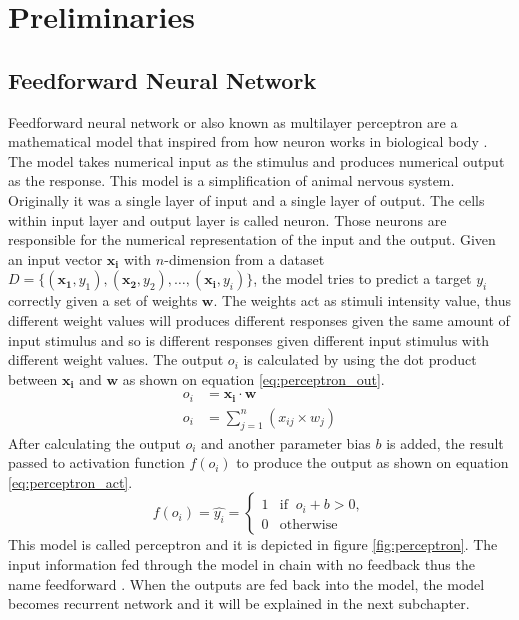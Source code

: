 \chapter{Preliminaries}
\label{chap:preliminaries}

\section{Feedforward Neural Network}
    Feedforward neural network or also known as multilayer perceptron
    are a mathematical model that inspired from how neuron works in
    biological body \citep{Goodfellow-et-al-2016}. The model takes
    numerical input as the stimulus and produces numerical output as
    the response. This model is a simplification of animal nervous
    system. Originally it was a single layer of input and a single
    layer of output. The cells within input layer and output layer is
    called neuron. Those neurons are responsible for the numerical
    representation of the input and the output. Given an input vector
    $\mathbf{x_i}$ with $n$-dimension from a dataset $D =
    \{(\mathbf{x_1}, y_1), (\mathbf{x_2}, y_2), \dots, (\mathbf{x_i},
    y_i)\}$, the model tries to predict a target $y_i$ correctly given
    a set of weights $\mathbf{w}$. The weights act as stimuli
    intensity value, thus different weight values will produces
    different responses given the same amount of input stimulus and so
    is different responses given different input stimulus with
    different weight values. The output $o_i$ is calculated by using
    the dot product between $\mathbf{x_i}$ and $\mathbf{w}$ as shown
    on equation \ref{eq:perceptron_out}. 
    \begin{align}
        \label{eq:perceptron_out}
        o_i &= \mathbf{x_i} \cdot \mathbf{w} \\
        o_i &= \sum_{j=1}^n (x_{ij} \times w_j)
    \end{align}
    After calculating the output $o_i$ and another parameter bias $b$ is
    added, the result passed to activation function $f(o_i)$ to produce
    the output as shown on equation
    \ref{eq:perceptron_act}.
    \begin{equation}
        \label{eq:perceptron_act}
        f(o_i) = \hat{y_i} =
        \begin{cases}
            1 & \text{if }\ o_i + b > 0,\\
            0 & \text{otherwise}
        \end{cases}
    \end{equation}
    This model is called perceptron and it is depicted in figure
    \ref{fig:perceptron}. The input information fed through the model
    in chain with no feedback thus the name feedforward
    \citep{Goodfellow-et-al-2016}. When the outputs are fed back into
    the model, the model becomes recurrent network and it will be
    explained in the next subchapter.

